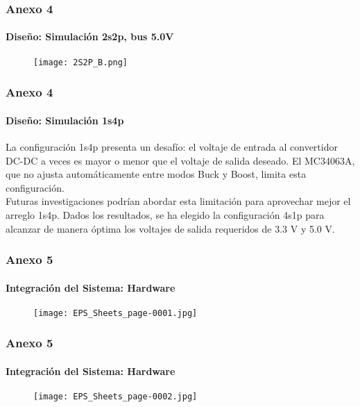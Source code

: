 \begin{frame}
    \frametitle{Anexo 4}
    \framesubtitle{Diseño: Simulación 2s2p, bus 5.0V}
    \begin{figure}[H]
        \centering
        \texttt{[image: 2S2P\_B.png]} %
        \label{fig:2S2P_B}
    \end{figure}
\end{frame}


\begin{frame}
    \frametitle{Anexo 4}
    \framesubtitle{Diseño: Simulación 1s4p}
    
    La configuración 1s4p presenta un desafío: el voltaje de entrada al convertidor DC-DC a veces es mayor o menor que el voltaje de salida deseado. El MC34063A, que no ajusta automáticamente entre modos Buck y Boost, limita esta configuración.\\
    \vspace{0.5 cm}
    Futuras investigaciones podrían abordar esta limitación para aprovechar mejor el arreglo 1s4p. Dados los resultados, se ha elegido la configuración 4s1p para alcanzar de manera óptima los voltajes de salida requeridos de 3.3 V y 5.0 V.
\end{frame}


\begin{frame}
    \frametitle{Anexo 5}
    \framesubtitle{Integración del Sistema: Hardware}

    \begin{figure}[H]
        \centering
        \texttt{[image: EPS\_Sheets\_page-0001.jpg]} %
        \label{fig:Esquematico1}
    \end{figure}
\end{frame}



\begin{frame}
    \frametitle{Anexo 5}
    \framesubtitle{Integración del Sistema: Hardware}
    \begin{figure}[H]
        \centering
        \texttt{[image: EPS\_Sheets\_page-0002.jpg]} %
        \label{fig:Esquematico2}
    \end{figure}
\end{frame}

